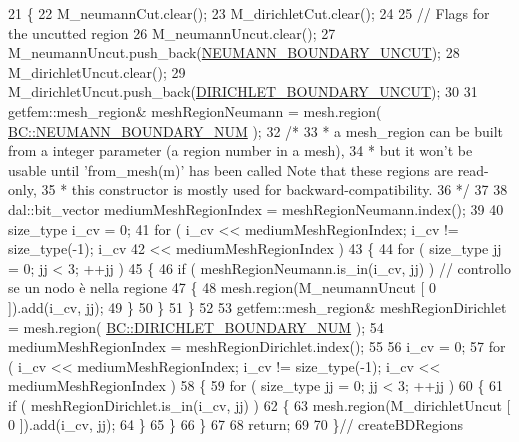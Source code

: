 \begin{DoxyCode}
21 \{
22     M\_neumannCut.clear();
23     M\_dirichletCut.clear();
24 
25     \textcolor{comment}{// Flags for the uncutted region}
26     M\_neumannUncut.clear();
27     M\_neumannUncut.push\_back(\hyperlink{classBCHandler_a2bc86209db0836dbc6ca56e1ca4e4ac1aa538eee48606669ac37073ca65144007}{NEUMANN\_BOUNDARY\_UNCUT});
28     M\_dirichletUncut.clear();
29     M\_dirichletUncut.push\_back(\hyperlink{classBCHandler_a2bc86209db0836dbc6ca56e1ca4e4ac1a487ba8af2086045d8b0df840b2525866}{DIRICHLET\_BOUNDARY\_UNCUT});
30 
31     getfem::mesh\_region& meshRegionNeumann = mesh.region( 
      \hyperlink{classBC_ad1b507696802f73b95c0ca59f4c41390a432aa77a00d8eb4929463ef8d57b5c04}{BC::NEUMANN\_BOUNDARY\_NUM} );
32 \textcolor{comment}{/*}
33 \textcolor{comment}{ *  a mesh\_region can be built from a integer parameter (a region number in a mesh),}
34 \textcolor{comment}{ *  but it won't be usable until 'from\_mesh(m)' has been called Note that these regions are read-only, }
35 \textcolor{comment}{ *  this constructor is mostly used for backward-compatibility.}
36 \textcolor{comment}{ */}
37 
38     dal::bit\_vector mediumMeshRegionIndex = meshRegionNeumann.index();
39 
40     size\_type i\_cv = 0;
41     \textcolor{keywordflow}{for} ( i\_cv << mediumMeshRegionIndex; i\_cv != size\_type(-1); i\_cv
42             << mediumMeshRegionIndex )
43     \{
44         \textcolor{keywordflow}{for} ( size\_type jj = 0; jj < 3; ++jj )
45         \{
46             \textcolor{keywordflow}{if} ( meshRegionNeumann.is\_in(i\_cv, jj) ) \textcolor{comment}{// controllo se un nodo è nella regione}
47             \{
48                 mesh.region(M\_neumannUncut [ 0 ]).add(i\_cv, jj);
49             \}
50         \}
51     \}
52 
53     getfem::mesh\_region& meshRegionDirichlet = mesh.region( 
      \hyperlink{classBC_ad1b507696802f73b95c0ca59f4c41390a99103ccd54ba29b1bd2670cc6cd0c462}{BC::DIRICHLET\_BOUNDARY\_NUM} );
54     mediumMeshRegionIndex = meshRegionDirichlet.index();
55 
56     i\_cv = 0;
57     \textcolor{keywordflow}{for} ( i\_cv << mediumMeshRegionIndex; i\_cv != size\_type(-1); i\_cv << mediumMeshRegionIndex )
58     \{
59         \textcolor{keywordflow}{for} ( size\_type jj = 0; jj < 3; ++jj )
60         \{
61             \textcolor{keywordflow}{if} ( meshRegionDirichlet.is\_in(i\_cv, jj) )
62             \{
63                 mesh.region(M\_dirichletUncut [ 0 ]).add(i\_cv, jj);
64             \}
65         \}
66     \}
67     
68     \textcolor{keywordflow}{return};
69     
70 \}\textcolor{comment}{// createBDRegions}
\end{DoxyCode}
